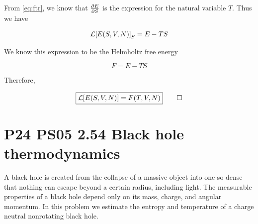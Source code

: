 \documentclass[9pt,a4paper,twocolumn]{article}
\begin{document}
From \eqref{eq:ftr}, we know that $\pdv{E}{S}$ is the expression for the natural variable $T$. Thus we have

\begin{equation}
	\mathcal{L}\qty[E\qty(S,V,N)]_S = E - TS
\end{equation}

We know this expression to be the Helmholtz free energy

\begin{equation}\label{eq:helmholtz}
		F = E - TS
\end{equation}

Therefore,

\begin{equation}\label{eq:answer}
	\boxed{
		\mathcal{L}\qty[E\qty(S,V,N)] = F\qty(T,V,N)
	} \qed
\end{equation}

\section{P24 PS05 2.54 Black hole thermodynamics}
A black hole is created from the collapse of a massive object into one so dense that nothing can escape beyond a certain radius, including light. The measurable properties of a black hole depend only on its mass, charge, and angular momentum. In this problem we estimate the entropy and temperature of a charge neutral nonrotating black hole.
\end{document}
